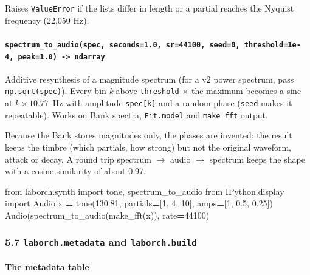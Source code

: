 \documentclass[
  10pt,
]{article}
\newenvironment{Shaded}{\begin{snugshade}}{\end{snugshade}}
\newcommand{\DecValTok}[1]{\textcolor[rgb]{0.00,0.00,0.81}{#1}}
\newcommand{\FloatTok}[1]{\textcolor[rgb]{0.00,0.00,0.81}{#1}}
\newcommand{\ImportTok}[1]{#1}
\newcommand{\NormalTok}[1]{#1}
\newcommand{\OperatorTok}[1]{\textcolor[rgb]{0.81,0.36,0.00}{\textbf{#1}}}
\begin{document}
Raises \texttt{ValueError} if the lists differ in length or
a partial reaches the Nyquist frequency (22,050 Hz).

\paragraph{\texorpdfstring{\texttt{spectrum\_to\_audio(spec,\ seconds=1.0,\ sr=44100,\ seed=0,\ threshold=1e-4,\ peak=1.0)\ -\textgreater{}\ ndarray}}{spectrum\_to\_audio(spec, seconds=1.0, sr=44100, seed=0, threshold=1e-4, peak=1.0) -\textgreater{} ndarray}}

Additive resynthesis of a magnitude spectrum (for a v2 power
spectrum, pass \texttt{np.sqrt(spec)}). Every bin \emph{k}
above \texttt{threshold} $\times$ the maximum becomes a sine at
$k \times 10.77$~Hz with amplitude \texttt{spec{[}k{]}} and
a random phase (\texttt{seed} makes it repeatable). Works on
Bank spectra, \texttt{Fit.model} and \texttt{make\_fft}
output.

Because the Bank stores magnitudes only, the phases are
invented: the result keeps the timbre (which partials, how
strong) but not the original waveform, attack or decay. A
round trip spectrum $\rightarrow$ audio $\rightarrow$ spectrum keeps the shape with
a cosine similarity of about 0.97.

\begin{Shaded}
\begin{Highlighting}[]
\ImportTok{from}\NormalTok{ laborch.synth }\ImportTok{import}\NormalTok{ tone, spectrum\_to\_audio}
\ImportTok{from}\NormalTok{ IPython.display }\ImportTok{import}\NormalTok{ Audio}
\NormalTok{x }\OperatorTok{=}\NormalTok{ tone(}\FloatTok{130.81}\NormalTok{, partials}\OperatorTok{=}\NormalTok{[}\DecValTok{1}\NormalTok{, }\DecValTok{4}\NormalTok{, }\DecValTok{10}\NormalTok{], amps}\OperatorTok{=}\NormalTok{[}\DecValTok{1}\NormalTok{, }\FloatTok{0.5}\NormalTok{, }\FloatTok{0.25}\NormalTok{])}
\NormalTok{Audio(spectrum\_to\_audio(make\_fft(x)), rate}\OperatorTok{=}\DecValTok{44100}\NormalTok{)}
\end{Highlighting}
\end{Shaded}

\subsubsection{\texorpdfstring{5.7 \texttt{laborch.metadata}
and
\texttt{laborch.build}}{5.7 laborch.metadata and laborch.build}}

\paragraph{The metadata table}
\end{document}
